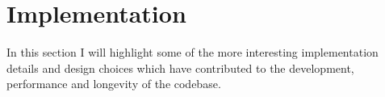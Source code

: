\section{Implementation}

In this section I will highlight some of the more interesting implementation details and design choices which have contributed to the development, performance and longevity of the codebase.




